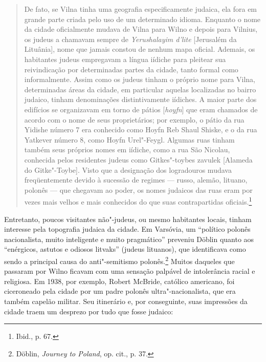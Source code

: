 \begin{quote}
De fato, se Vilna tinha uma geografia especificamente judaica, ela fora
em grande parte criada pelo uso de um determinado idioma. Enquanto o
nome da cidade oficialmente mudava de Vilna para Wilno e depois para
Vilnius, os judeus a chamavam sempre de \emph{Yerushalayim d'lite}
{[}Jerusalém da Lituânia{]}, nome que jamais constou de nenhum mapa
oficial. Ademais, os habitantes judeus empregavam a língua iídiche para
pleitear sua reivindicação por determinadas partes da cidade, tanto
formal como informalmente. Assim como os judeus tinham o próprio nome
para Vilna, determinadas áreas da cidade, em particular aquelas
localizadas no bairro judaico, tinham denominações distintivamente
iídiches. A maior parte dos edifícios se organizavam em torno de pátios
{[}\emph{hoyfn}{]} que eram chamados de acordo com o nome de seus
proprietários; por exemplo, o pátio da rua Yidishe número 7 era
conhecido como Hoyfn Reb Shaul Shiske, e o da rua Yatkever número 8,
como Hoyfn Urel"-Feygl. Algumas ruas tinham também seus próprios nomes em
iídiche, como a rua São Nicolau, conhecida pelos residentes judeus como
Gitkes"-toybes zavulek {[}Alameda do Gitke"-Toybe{]}. Visto que a
designação dos logradouros mudava freqüentemente devido à sucessão de
regimes --- russo, alemão, lituano, polonês --- que chegavam ao poder, os
nomes judaicos das ruas eram por vezes mais velhos e mais conhecidos do
que suas contrapartidas oficiais.\footnote{Ibid., p. 67.}
\end{quote}

Entretanto, poucos visitantes não"-judeus, ou mesmo habitantes locais,
tinham interesse pela topografia judaica da cidade. Em Varsóvia, um
``político polonês nacionalista, muito inteligente e muito pragmático''
preveniu Döblin quanto aos ``enérgicos, astutos e odiosos litvaks''
(judeus lituanos), que identificava como sendo a principal causa do
anti"-semitismo polonês.\footnote{Döblin, \emph{Journey to Poland}, op.
  cit., p. 37.} Muitos daqueles que passaram por Wilno ficavam com uma
sensação palpável de intolerância racial e religiosa. Em 1938, por
exemplo, Robert McBride, católico americano, foi ciceroneado pela cidade
por um padre polonês ultra"-nacionalista, que era também capelão militar.
Seu itinerário e, por conseguinte, suas impressões da cidade traem um
desprezo por tudo que fosse judaico:

